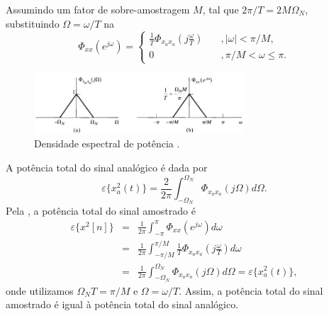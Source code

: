 \begin{frame}[allowframebreaks]
  \framebreak

  Assumindo um fator de sobre-amostragem $M$, tal que $2\pi/T = 2M\Omega_N$, substituindo $\Omega = \omega/T$ na 
  \begin{equation}
  \label{eq-Phixxiw}
  \Phi_{xx} (e^{j\omega}) = \begin{cases} \frac{1}{T} \Phi_{x_a x_a} \left( j \frac{\omega}{T} \right)   \quad & , |\omega| < \pi/M,  \\ 
  0 & , \pi/M < \omega \le \pi .\end{cases}
  \end{equation}
  
  \begin{figure}[h!]
  \centering
  \includegraphics[width=0.7\textwidth]{images/oppenheim_fig458.png}
  \caption{Densidade espectral de potência \citep{oppenheim2009}.}
  \label{fig:oppenheim_fig458}
  \end{figure}

  \framebreak

  A potência total do sinal analógico é dada por
  \begin{equation}
  \varepsilon\{x_a^2(t)\} = \frac{2}{2\pi} \int_{-\Omega_N}^{\Omega_N} \Phi_{x_a x_a} (j \Omega) d\Omega .
  \end{equation}
  Pela , a potência total do sinal amostrado é
  \begin{eqnarray}
  \varepsilon\{x^2[n]\} &=& \frac{1}{2\pi} \int_{-\pi}^{\pi} \Phi_{xx}(e^{j\omega}) d\omega \nonumber \\
                        &=& \frac{1}{2\pi} \int_{-\pi/M}^{\pi/M} \frac{1}{T} \Phi_{x_a x_a} \left( j \frac{\omega}{T} \right) d\omega \nonumber \\
                        &=& \frac{1}{2\pi} \int_{-\Omega_N}^{\Omega_N} \Phi_{x_a x_a} (j\Omega) d\Omega = \varepsilon\{x_a^2(t)\} ,
  \end{eqnarray}
  onde utilizamos $\Omega_N T = \pi/M$ e $\Omega = \omega/T$.
  Assim, a potência total do sinal amostrado é igual à potência total do sinal analógico.

  \framebreak
 

\end{frame}
